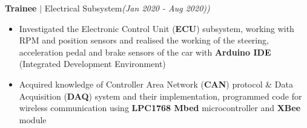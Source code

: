\documentclass[10pt,a4paper,sans]{moderncv}        %
\newcommand{\rhsmalle}[1]{\hfill{\footnotesize{\textsl{(#1)}}}\\[-12pt]}
\begin{document}
{\small\textbf{Trainee} \small$\mid$ Electrical Subsystem}\rhsmalle{Jan 2020 - Aug 2020)}
\begin{itemize}
	\item Investigated the {Electronic Control Unit} (\textbf{ECU}) subsystem, working with {RPM} and {position sensors} and realised the working of the steering, acceleration pedal and brake sensors of the car with \textbf{Arduino IDE} (Integrated Development Environment)
	\item Acquired knowledge of {Controller Area Network} (\textbf{CAN}) protocol \& {Data Acquisition} (\textbf{DAQ}) system and their implementation, programmed code for wireless communication using \textbf{LPC1768 Mbed} microcontroller and \textbf{XBee} module
\end{itemize}
\end{document}
